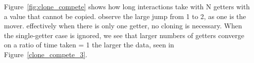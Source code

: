 Figure~\ref{fig:clone_compete} shows how long interactions take with N getters with a value that cannot be copied. observe the large jump from 1 to 2, as one is the mover. effectively when there is only one getter, no cloning is necessary. When the single-getter case is ignored, we see that larger numbers of getters converge on a ratio of time taken = 1 the larger the data, seen in Figure~\ref{clone_compete_3}.
\begin{figure}
\centering
{}
\end{figure}
